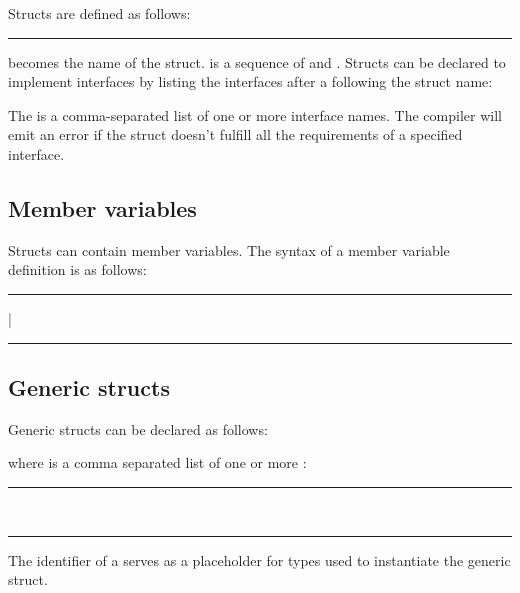 Structs are defined as follows:

\begin{grammar}
\rule{struct-definition}   \code{\{}  \code{\}}
\end{grammar}

 becomes the name of the struct.
 is a sequence of
 and
. Structs can be declared to implement
interfaces by listing the interfaces after a \code{:} following the struct name:

\begin{grammar}
  \code{:}  \code{\{}  \code{\}}
\end{grammar}

The  is a comma-separated list of one or more
interface names. The compiler will emit an error if the struct doesn't fulfill
all the requirements of a specified interface.

\subsection{Member variables}

Structs can contain member variables. The syntax of a member variable definition
is as follows:

\begin{grammar}
\rule{let-or-var}  | \\
\rule{member-variable-declaration}   \code{:}  \code{;}
\end{grammar}

\subsection{Generic structs}

Generic structs can be declared as follows:

\begin{grammar}
  \code{<}  \code{>} \code{\{}  \code{\}}
\end{grammar}

where  is a comma separated list of one or
more :

\begin{grammar}
\rule{generic-parameter} \\
\rule{generic-type-parameter} 
\end{grammar}

The identifier of a  serves as a placeholder
for types used to instantiate the generic struct.
